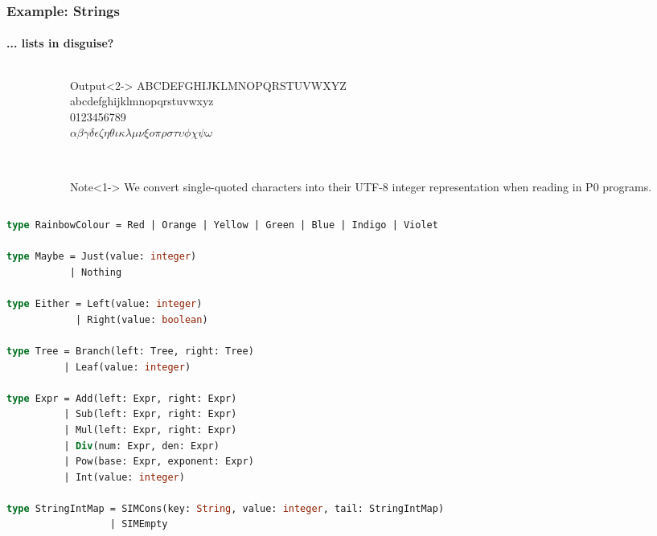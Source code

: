 \documentclass{beamer}
\newcommand\omicron{o}
\begin{document}
\begin{frame}
\frametitle{Example: Strings}
\framesubtitle{... lists in disguise?}
    \begin{columns}[T,onlytextwidth]
        \begin{column}{.65\textwidth}
            \begin{minipage}{\textwidth}
                \usebox{\exampleString}
            \end{minipage}
        \end{column}
        \begin{column}{.35\textwidth}
            \begin{onlyenv}
                \begin{minipage}{\textwidth}
                    \begin{block}{Output}<2->\tiny
                        ABCDEFGHIJKLMNOPQRSTUVWXYZ\\
                        abcdefghijklmnopqrstuvwxyz\\
                        0123456789\\
                        $\alpha\beta\gamma\delta\epsilon\zeta\eta\theta\iota\kappa\lambda\mu\nu\xi\omicron\pi\rho\sigma\tau\upsilon\phi\chi\psi\omega$
                    \end{block}
                    
                    \ \\
                    
                    \begin{block}{Note}<1->\tiny
                        We convert single-quoted characters into their UTF-8 integer representation when reading in P0 programs.
                    \end{block}
                \end{minipage}
            \end{onlyenv}
        \end{column}
    \end{columns}
\end{frame}



\begin{lrbox}{\exampleImagination}
\begin{lstlisting}[language=Pascal,basicstyle=\tiny]
type RainbowColour = Red | Orange | Yellow | Green | Blue | Indigo | Violet

type Maybe = Just(value: integer)
           | Nothing

type Either = Left(value: integer)
            | Right(value: boolean)

type Tree = Branch(left: Tree, right: Tree)
          | Leaf(value: integer)

type Expr = Add(left: Expr, right: Expr)
          | Sub(left: Expr, right: Expr)
          | Mul(left: Expr, right: Expr)
          | Div(num: Expr, den: Expr)
          | Pow(base: Expr, exponent: Expr)
          | Int(value: integer)

type StringIntMap = SIMCons(key: String, value: integer, tail: StringIntMap)
                  | SIMEmpty

\end{lstlisting}
\end{lrbox}
\end{document}
